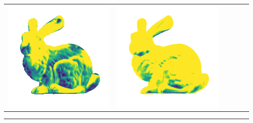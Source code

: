 \begin{center}
\begin{tabularx}{\linewidth}{@{}Y@{}Y@{}Y@{}Y@{}Y@{}Y@{}}
\includegraphics[width=\linewidth]{semisynthetic/20150514_14_marrnet_err.png} &
\includegraphics[width=\linewidth]{semisynthetic/20150514_14_ef_err.png} \\
\end{tabularx}
\begin{center}\rule{0.5\linewidth}{\linethickness}\end{center}


\end{center}
